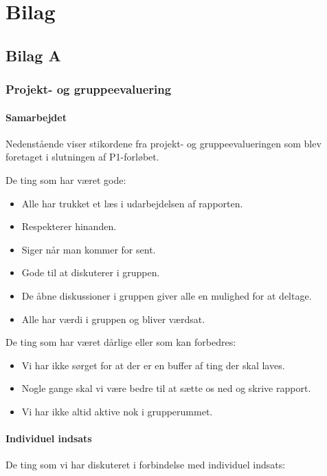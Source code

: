 \documentclass[oneside,a4paper,titlepage]{article}
\begin{document}
\section{Bilag}


\subsection{Bilag A}

\subsubsection*{Projekt- og gruppeevaluering}
\label{sec:gruppeevaluering}

\paragraph{Samarbejdet}

Nedenstående viser stikordene fra projekt- og gruppeevalueringen som blev foretaget i slutningen af P1-forløbet.

De ting som har været gode:
\begin{itemize}
\item Alle har trukket et læs i udarbejdelsen af rapporten. 
\item Respekterer hinanden.
\item Siger når man kommer for sent. 
\item Gode til at diskuterer i gruppen. 
\item De åbne diskussioner i gruppen giver alle en mulighed for at deltage. 
\item Alle har værdi i gruppen og bliver værdsat.
\end{itemize}

De ting som har været dårlige eller som kan forbedres:
\begin{itemize}
\item Vi har ikke sørget for at der er en buffer af ting der skal laves.
\item Nogle gange skal vi være bedre til at sætte os ned og skrive rapport.
\item Vi har ikke altid aktive nok i grupperummet.
\end{itemize}

\paragraph{Individuel indsats}

De ting som vi har diskuteret i forbindelse med individuel indsats:
\end{document}
